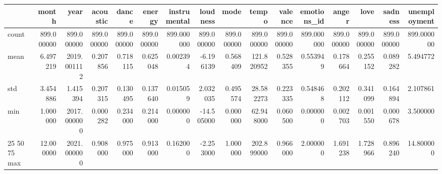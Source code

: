 \begin{tabular}{lrrrrrrrrrrrrrrr}
\toprule
 & month & year & acoustic & dance & energy & instrumental & loudness & mode & tempo & valence & emotions_id & anger & love & sadness & unemployment \\
\midrule
count & 899.000000 & 899.000000 & 899.000000 & 899.000000 & 899.000000 & 899.000000 & 899.000000 & 899.000000 & 899.000000 & 899.000000 & 899.000000 & 899.000000 & 899.000000 & 899.000000 & 899.000000 \\
mean & 6.497219 & 2019.001112 & 0.207856 & 0.718115 & 0.625048 & 0.002394 & -6.196139 & 0.568409 & 121.820952 & 0.528355 & 0.553949 & 0.178664 & 0.255152 & 0.089282 & 5.494772 \\
std & 3.454886 & 1.415394 & 0.207315 & 0.130495 & 0.137640 & 0.015059 & 2.032035 & 0.495574 & 28.582273 & 0.223335 & 0.548468 & 0.202112 & 0.341099 & 0.164894 & 2.107861 \\
min & 1.000000 & 2017.000000 & 0.000282 & 0.234000 & 0.214000 & 0.000000 & -14.505000 & 0.000000 & 62.948000 & 0.060500 & 0.000000 & 0.002703 & 0.001550 & 0.000678 & 3.500000 \\
25%
50%
75%
max & 12.000000 & 2021.000000 & 0.908000 & 0.975000 & 0.913000 & 0.162000 & -2.253000 & 1.000000 & 202.899000 & 0.966000 & 2.000000 & 1.691238 & 1.728966 & 0.896240 & 14.800000 \\
\bottomrule
\end{tabular}
